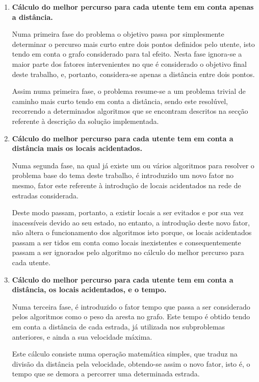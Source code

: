 \documentclass[relatorio.tex]{subfiles}
\begin{document}
\begin{enumerate}[listparindent=2em]
\item {\bfseries Cálculo do melhor percurso para cada utente tem em conta apenas a distância.}

Numa primeira fase do problema o objetivo passa por simplesmente determinar o percurso mais curto entre dois pontos definidos pelo utente, isto tendo em conta o grafo considerado para tal efeito. Nesta fase ignora-se a maior parte dos fatores intervenientes no que é considerado o objetivo final deste trabalho, e, portanto, considera-se apenas a distância entre dois pontos.

Assim numa primeira fase, o problema resume-se a um problema trivial de caminho mais curto tendo em conta a distância, sendo este resolúvel, recorrendo a determinados algoritmos que se encontram descritos na secção referente à descrição da solução implementada.

\item {\bfseries Cálculo do melhor percurso para cada utente tem em conta a distância mais os locais acidentados.}

Numa segunda fase, na qual já existe um ou vários algoritmos para resolver o problema base do tema deste trabalho, é introduzido um novo fator no mesmo, fator este referente à introdução de locais acidentados na rede de estradas considerada. 

Deste modo passam, portanto, a existir locais a ser evitados e por sua vez inacessíveis devido ao seu estado, no entanto, a introdução deste novo fator, não altera o funcionamento dos algoritmos isto porque, os locais acidentados passam a ser tidos em conta como locais inexistentes e consequentemente passam a ser ignorados pelo algoritmo no cálculo do melhor percurso para cada utente. 

\item {\bfseries Cálculo do melhor percurso para cada utente tem em conta a distância, os locais acidentados, e o tempo.}

Numa terceira fase, é introduzido o fator tempo que passa a ser considerado pelos algoritmos como o peso da aresta no grafo. Este tempo é obtido tendo em conta a distância de cada estrada, já utilizada nos subproblemas anteriores, e ainda a sua velocidade máxima. 

Este cálculo consiste numa operação matemática simples, que traduz na divisão da distância pela velocidade, obtendo-se assim o novo fator, isto é, o tempo que se demora a percorrer uma determinada estrada.


\end{enumerate}
\end{document}
